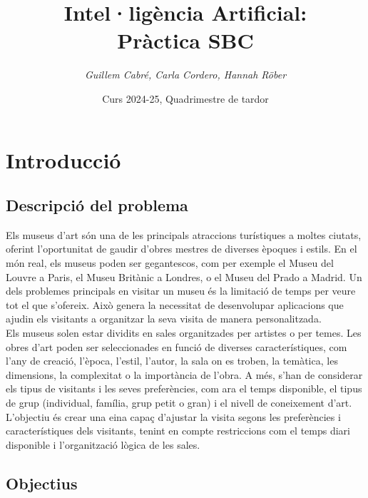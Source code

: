\documentclass[a4paper]{article}
\title{\textbf{Intel·ligència Artificial:\\
		Pràctica SBC}}
\author{\emph{Guillem Cabré, Carla Cordero, Hannah Röber}}
\date{Curs 2024-25, Quadrimestre de tardor}
\begin{document}
	
	\begin{titlepage}
		\clearpage\maketitle
		\thispagestyle{empty}
	\end{titlepage}
	
	\tableofcontents
	\clearpage
	
	\section{Introducció}
	
	\subsection{Descripció del problema}
	
	Els museus d’art són una de les principals atraccions turístiques a moltes ciutats, oferint l’oportunitat de gaudir d’obres mestres de diverses èpoques i estils. En el món real, els museus poden ser gegantescos, com per exemple el Museu del Louvre a Paris, el Museu Britànic a Londres, o el Museu del Prado a Madrid. Un dels problemes principals en visitar un museu és la limitació de temps per veure tot el que s’ofereix. Això genera la necessitat de desenvolupar aplicacions que ajudin els visitants a organitzar la seva visita de manera personalitzada. \\
	
	Els museus solen estar dividits en sales organitzades per artistes o per temes. Les obres d’art poden ser seleccionades en funció de diverses característiques, com l’any de creació, l’època, l’estil, l’autor, la sala on es troben, la temàtica, les dimensions, la complexitat o la importància de l’obra. A més, s’han de considerar els tipus de visitants i les seves preferències, com ara el temps disponible, el tipus de grup (individual, família, grup petit o gran) i el nivell de coneixement d’art. \\
	
	L’objectiu és crear una eina capaç d’ajustar la visita segons les preferències i característiques dels visitants, tenint en compte restriccions com el temps diari disponible i l’organització lògica de les sales.
	
	\subsection{Objectius}
	
\end{document}
